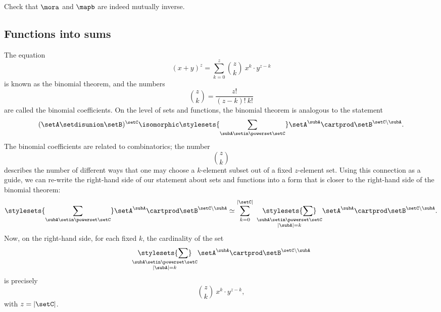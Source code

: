 \begin{gradedexercise}
    Check that $\mora$ and $\mapb$ are indeed mutually inverse.
\end{gradedexercise}


\subsection{Functions into sums}

The equation
\begin{equation}
    (x + y)^z = \sum_{k = 0}^z {{z}\choose{k}} \ x^k \cdot y^{z - k}
\end{equation}
is known as the binomial theorem, and the numbers
\begin{equation}
    {{z}\choose{k}} = \frac{z!}{(z-k)! \ k!}
\end{equation}
are called the binomial coefficients. On the level of sets and functions, the binomial theorem is analogous to the statement
\begin{equation}
    (\setA \setdisunion \setB)^{\setC}  \isomorphic \stylesets{\sum_{\subA \setin \powerset \setC}} \setA^\subA \cartprod \setB^{\setC \backslash \subA}.
\end{equation}
The binomial coefficients are related to combinatorics; the number
\begin{equation}
    {{z}\choose{k}}
\end{equation}
describes the number of different ways that one may choose a $k$-element subset out of a fixed $z$-element set. Using this connection as a guide, we can re-write the right-hand side of our statement about sets and functions into a form that is closer to the right-hand side of the binomial theorem:
\begin{equation}
    \stylesets{\sum_{\subA \setin \powerset \setC}} \setA^\subA \cartprod \setB^{\setC \backslash \subA} \simeq \sum_{k = 0}^{\vert \setC \vert} \ \underset{\substack{\subA \setin \powerset \setC \\ \vert \subA \vert = k}}{\stylesets{\sum}} \setA^\subA \cartprod \setB^{\setC \backslash \subA}.
\end{equation}
Now, on the right-hand side, for each fixed $k$, the cardinality of the set
\begin{equation}
    \underset{\substack{\subA \setin \powerset \setC \\ \vert \subA \vert = k}}{\stylesets{\sum}} \setA^\subA \cartprod \setB^{\setC \backslash \subA}
\end{equation}
is precisely
\begin{equation}
    {{z}\choose{k}} \ x^k \cdot y^{z - k},
\end{equation}
with $z = \vert \setC \vert$.

